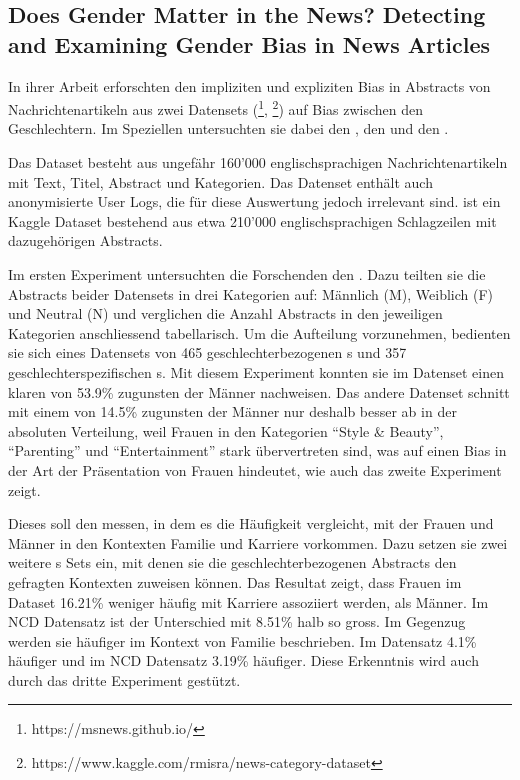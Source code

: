 \subsection{Does Gender Matter in the News? Detecting and Examining Gender Bias in News Articles}

In ihrer Arbeit  \cite{does-gender-matter-in-the-news} erforschten \citeauthor{does-gender-matter-in-the-news}
den impliziten und expliziten Bias in Abstracts von Nachrichtenartikeln aus zwei Datensets (\footnote{https://msnews.github.io/}, 
\footnote{https://www.kaggle.com/rmisra/news-category-dataset}) auf Bias zwischen den
Geschlechtern. Im Speziellen untersuchten sie dabei den , den  und den .

Das  Dataset besteht aus ungefähr 160'000 englischsprachigen Nachrichtenartikeln mit Text, Titel, Abstract und Kategorien. Das Datenset enthält
auch anonymisierte User Logs, die für diese Auswertung jedoch irrelevant sind.  ist ein Kaggle Dataset bestehend aus etwa 210'000 englischsprachigen
Schlagzeilen mit dazugehörigen Abstracts.


Im ersten Experiment untersuchten die Forschenden den . Dazu teilten sie die Abstracts beider Datensets
in drei Kategorien auf: Männlich (M), Weiblich (F) und Neutral (N) und verglichen die Anzahl Abstracts in den jeweiligen Kategorien
anschliessend tabellarisch. Um die Aufteilung vorzunehmen, bedienten sie sich eines Datensets von 465 geschlechterbezogenen s und
357 geschlechterspezifischen s. Mit diesem Experiment konnten sie im  Datenset einen klaren 
von 53.9\% zugunsten der Männer nachweisen. Das andere Datenset schnitt mit einem  von 14.5\% zugunsten der Männer nur
deshalb besser ab in der absoluten Verteilung, weil Frauen in den Kategorien \enquote{Style \& Beauty},
\enquote{Parenting} und \enquote{Entertainment} stark übervertreten sind, was auf einen Bias in der Art der Präsentation von Frauen hindeutet,
wie auch das zweite Experiment zeigt.

Dieses soll den  messen, in dem es die Häufigkeit vergleicht, mit der Frauen und Männer in den Kontexten Familie und Karriere
vorkommen. Dazu setzen sie zwei weitere s Sets ein, mit denen sie die geschlechterbezogenen Abstracts den gefragten
Kontexten zuweisen können. Das Resultat zeigt, dass Frauen im  Dataset 16.21\% weniger häufig mit Karriere assoziiert werden, als Männer. Im NCD Datensatz
ist der Unterschied mit 8.51\% halb so gross. Im Gegenzug werden sie häufiger im Kontext von Familie beschrieben. Im  Datensatz 4.1\% häufiger und im
NCD Datensatz 3.19\% häufiger. Diese Erkenntnis wird auch durch das dritte Experiment gestützt.

